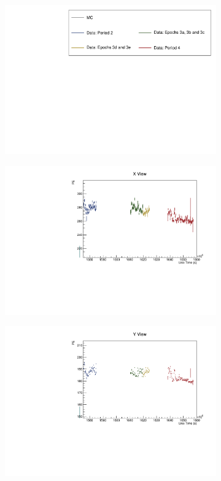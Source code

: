 \documentclass[12pt,a4paper]{article}
\begin{document}
\begin{figure}[h!]
  \begin{subfigure}{\textwidth}
    \centering
    \includegraphics[height=0.2\linewidth]{essentialsec_tb/legend.pdf}
  \end{subfigure}
  \vspace*{2mm}
  
  \begin{subfigure}{0.5\textwidth}
    \includegraphics[width=\linewidth]{driftsec_tb/pe_time_x.pdf}
  \end{subfigure}
  \begin{subfigure}{0.5\textwidth}
    \includegraphics[width=\linewidth]{driftsec_tb/pe_time_y.pdf}

\end{subfigure}
\end{figure}
\end{document}
